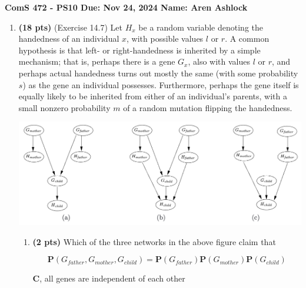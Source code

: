 \documentclass{article}
\begin{document}
\noindent\textbf{ComS 472 - PS10 \quad Due: Nov 24, 2024 \quad Name: Aren Ashlock}

\begin{enumerate}


\item \textbf{(18 pts)} (Exercise 14.7) Let $H_x$ be a random variable denoting the handedness of an individual $x$, with possible values $l$ or $r$. A common hypothesis is that left- or right-handedness is inherited by a simple mechanism; that is, perhaps there is a gene $G_x$, also with values $l$ or $r$, and perhaps actual handedness turns out mostly the same (with some probability $s$) as the gene an individual possesses. Furthermore, perhaps the gene itself is equally likely to be inherited from either of an individual’s parents, with a small nonzero probability $m$ of a random mutation flipping the handedness.

\begin{center}
    \includegraphics[scale=0.75]{472-PS10-Q1.png}
\end{center}

\begin{enumerate}[label=($\alph*$)]


    \item \textbf{(2 pts)} Which of the three networks in the above figure claim that

    \begin{equation*}
        \mathbf{P}(G_{father},G_{mother},G_{child})=\mathbf{P}(G_{father})\mathbf{P}(G_{mother})\mathbf{P}(G_{child})
    \end{equation*}

    \color{blue}
        \textbf{C}, all genes are independent of each other
    \color{black}



\end{enumerate}
\end{enumerate}
\end{document}
